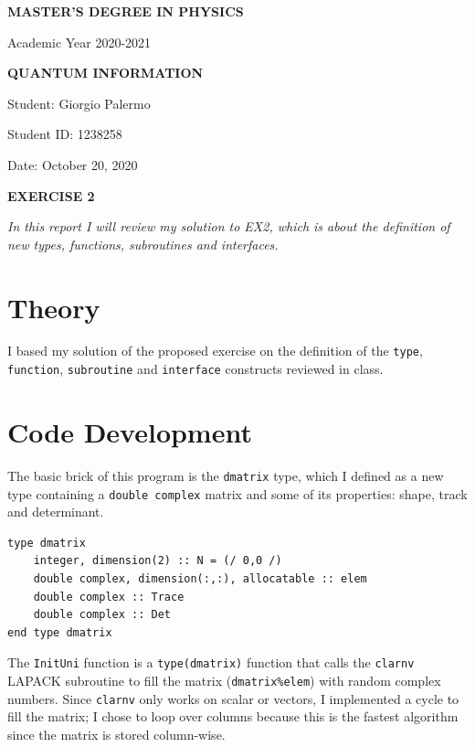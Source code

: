 \documentclass[a4paper]{article}
\newcommand{\thedate}{October 20, 2020}
\begin{document}
\hypersetup{linkcolor = black}
\hypersetup{linkcolor = blue}
\thispagestyle{plain}
\begin{center}
    \textbf{MASTER'S DEGREE IN PHYSICS}
    
    Academic Year 2020-2021
    
    \medskip
    \textbf{QUANTUM INFORMATION}
\end{center}

\vspace{0.0cm}
Student: Giorgio Palermo

Student ID: 1238258

Date: \thedate
\begin{center}
\textbf{EXERCISE 2}
\medskip
\end{center}
\noindent
\textit{In this report I will review my solution to EX2, which is about the definition of new types, functions, subroutines and interfaces.}

\section*{Theory}
I based my solution of the proposed exercise on the definition of the \lstinline{type}, \lstinline{function}, \lstinline{subroutine} and \lstinline{interface} constructs reviewed in class.

\section*{Code Development}
The basic brick of this program is the \lstinline{dmatrix} type, which I defined as a new type containing a \lstinline{double complex} matrix and some of its properties: shape, track and determinant.
\begin{lstlisting}
type dmatrix
    integer, dimension(2) :: N = (/ 0,0 /)
    double complex, dimension(:,:), allocatable :: elem
    double complex :: Trace
    double complex :: Det
end type dmatrix
\end{lstlisting}

The \lstinline{InitUni} function is a \lstinline{type(dmatrix)} function that calls the \lstinline{clarnv} LAPACK subroutine to fill the matrix (\lstinline{dmatrix%elem}) with random complex numbers.
Since \lstinline{clarnv} only works on scalar or vectors, I implemented a cycle to fill the matrix; I chose to loop over columns because this is the fastest algorithm since the matrix is stored column-wise.
\end{document}
